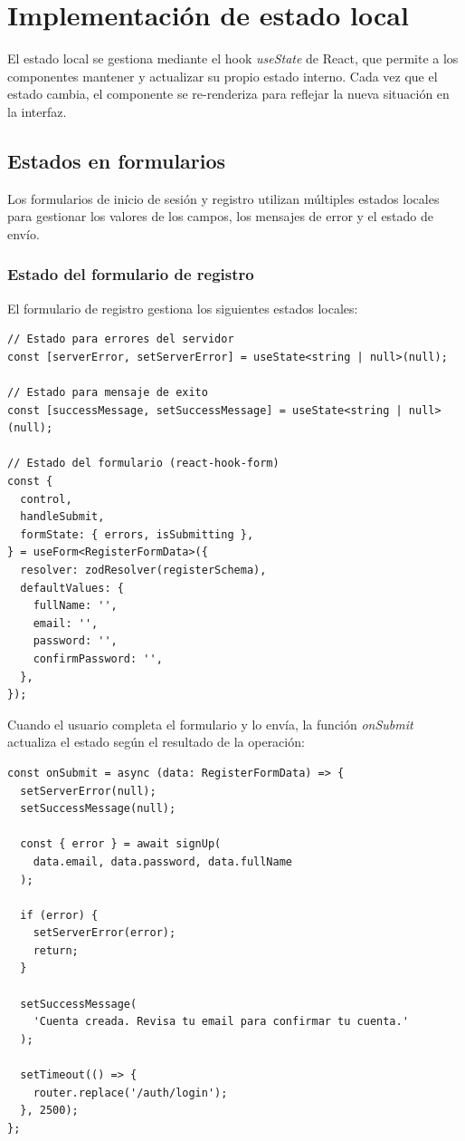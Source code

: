 
\section{Implementaci\'on de estado local}

El estado local se gestiona mediante el hook \textit{useState} de React,
que permite a los componentes mantener y actualizar su propio estado
interno. Cada vez que el estado cambia, el componente se re-renderiza
para reflejar la nueva situaci\'on en la interfaz.

\subsection{Estados en formularios}

Los formularios de inicio de sesi\'on y registro utilizan m\'ultiples
estados locales para gestionar los valores de los campos, los mensajes
de error y el estado de env\'io.

\subsubsection{Estado del formulario de registro}

El formulario de registro gestiona los siguientes estados locales:

\begin{lstlisting}
// Estado para errores del servidor
const [serverError, setServerError] = useState<string | null>(null);

// Estado para mensaje de exito
const [successMessage, setSuccessMessage] = useState<string | null>(null);

// Estado del formulario (react-hook-form)
const {
  control,
  handleSubmit,
  formState: { errors, isSubmitting },
} = useForm<RegisterFormData>({
  resolver: zodResolver(registerSchema),
  defaultValues: {
    fullName: '',
    email: '',
    password: '',
    confirmPassword: '',
  },
});
\end{lstlisting}

Cuando el usuario completa el formulario y lo env\'ia, la funci\'on
\textit{onSubmit} actualiza el estado seg\'un el resultado de la operaci\'on:

\begin{lstlisting}
const onSubmit = async (data: RegisterFormData) => {
  setServerError(null);
  setSuccessMessage(null);

  const { error } = await signUp(
    data.email, data.password, data.fullName
  );

  if (error) {
    setServerError(error);
    return;
  }

  setSuccessMessage(
    'Cuenta creada. Revisa tu email para confirmar tu cuenta.'
  );

  setTimeout(() => {
    router.replace('/auth/login');
  }, 2500);
};
\end{lstlisting}

